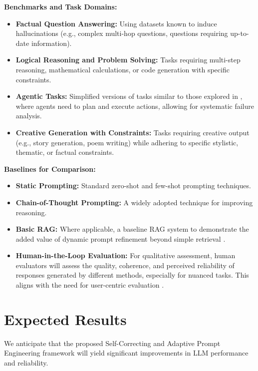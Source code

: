 \documentclass{article}
\begin{document}
\textbf{Benchmarks and Task Domains:}
\begin{itemize}
    \item \textbf{Factual Question Answering:} Using datasets known to induce hallucinations (e.g., complex multi-hop questions, questions requiring up-to-date information).
    \item \textbf{Logical Reasoning and Problem Solving:} Tasks requiring multi-step reasoning, mathematical calculations, or code generation with specific constraints.
    \item \textbf{Agentic Tasks:} Simplified versions of tasks similar to those explored in \cite{P1}, where agents need to plan and execute actions, allowing for systematic failure analysis.
    \item \textbf{Creative Generation with Constraints:} Tasks requiring creative output (e.g., story generation, poem writing) while adhering to specific stylistic, thematic, or factual constraints.
\end{itemize}

\textbf{Baselines for Comparison:}
\begin{itemize}
    \item \textbf{Static Prompting:} Standard zero-shot and few-shot prompting techniques.
    \item \textbf{Chain-of-Thought Prompting:} A widely adopted technique for improving reasoning.
    \item \textbf{Basic RAG:} Where applicable, a baseline RAG system to demonstrate the added value of dynamic prompt refinement beyond simple retrieval \cite{P5}.
\item \textbf{Human-in-the-Loop Evaluation:} For qualitative assessment, human evaluators will assess the quality, coherence, and perceived reliability of responses generated by different methods, especially for nuanced tasks. This aligns with the need for user-centric evaluation \cite{P2}.
\end{itemize}

\section{Expected Results}
We anticipate that the proposed Self-Correcting and Adaptive Prompt Engineering framework will yield significant improvements in LLM performance and reliability.
\end{document}

